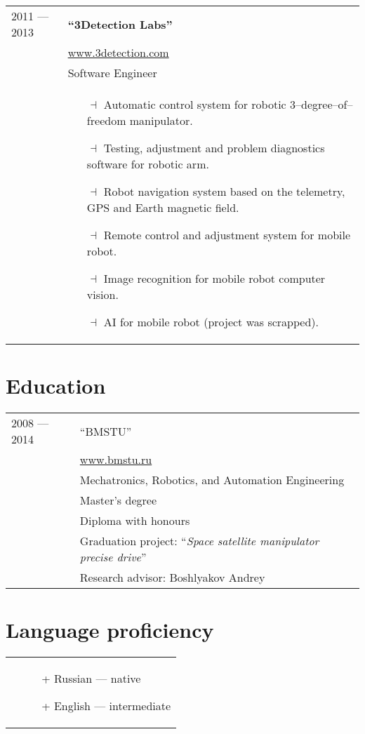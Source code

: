 \documentclass[a4paper, 10pt]{article}
\begin{document}
\begin{longtable}{p{20mm}|p{140mm}}
2011 --- 2013 & \textbf{``3Detection Labs''} \\
& \href{http://www.3detection.com/}{www.3detection.com} \\
& Software Engineer \\
& \begin{itemize}[topsep = 0pt, itemsep = 0pt]
    \item[$\dashv$] Automatic control system for robotic 3--degree--of--freedom manipulator.
    \item[$\dashv$] Testing, adjustment and problem diagnostics software for robotic arm.
    \item[$\dashv$] Robot navigation system based on the telemetry, GPS and Earth magnetic field.
    \item[$\dashv$] Remote control and adjustment system for mobile robot.
    \item[$\dashv$] Image recognition for mobile robot computer vision.
    \item[$\dashv$] AI for mobile robot (project was scrapped).
\end{itemize}
\\
\end{longtable}

\section{Education}
\begin{longtable}{p{20mm}|p{140mm}}
2008 --- 2014
& ``BMSTU'' \\
& \href{http://www.bmstu.ru}{www.bmstu.ru} \\
& Mechatronics, Robotics, and Automation Engineering \\
& Master's degree \\
& Diploma with honours \\
& Graduation project: ``\textit{Space satellite manipulator precise drive}'' \\
& Research advisor: Boshlyakov Andrey \\
\end{longtable}

\section{Language proficiency}
\begin{longtable}{p{20mm}|p{140mm}}
& \begin{itemize}[topsep = 0pt, itemsep = 0pt]
    \item[+] Russian --- native
    \item[+] English --- intermediate
\end{itemize} \\
\end{longtable}
\end{document}
